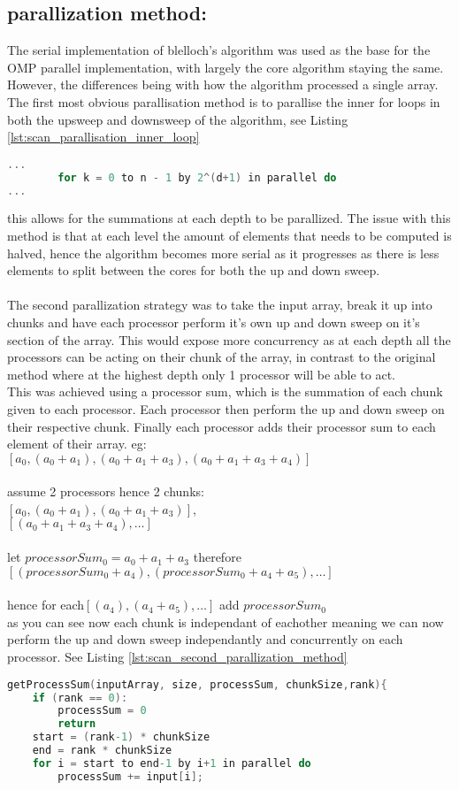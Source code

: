 \subsection*{parallization method:}
The serial implementation of blelloch's algorithm was used as the base for the OMP parallel implementation, with largely the core algorithm staying the same. However, the differences being with how the algorithm processed a single array. The first most obvious parallisation method is to parallise the inner for loops in both the upsweep and downsweep of the algorithm, see Listing \ref{lst:scan_parallisation_inner_loop} 
\begin{lstlisting}[language=C, caption={parallisation of the inner loop}, label={lst:scan_parallisation_inner_loop}]
...
		for k = 0 to n - 1 by 2^(d+1) in parallel do
...
\end{lstlisting}
this allows for the summations at each depth to be parallized. The issue with this method is that at each level the amount of elements that needs to be computed is halved, hence the algorithm becomes more serial as it progresses as there is less elements to split between the cores for both the up and down sweep.\\\\ The second parallization strategy was to take the input array, break it up into chunks and have each processor perform it's own up and down sweep on it's section of the array. This would expose more concurrency as at each depth all the processors can be acting on their chunk of the array, in contrast to the original method where at the highest depth only 1 processor will be able to act.\\This was achieved using a processor sum, which is the summation of each chunk given to each processor. Each processor then perform the up and down sweep on their respective chunk. Finally each processor adds their processor sum to each element of their array. 
eg: $[a_0,(a_0+a_1),(a_0+a_1+a_3),(a_0+a_1+a_3+a_4)]$\\
\\ assume 2 processors hence 2 chunks:\\
$[a_0,(a_0+a_1),(a_0+a_1+a_3)]$,\\$[(a_0+a_1+a_3+a_4),\dots]$\\
\\let $processorSum_0 = a_0+a_1+a_3$ therefore\\
$[(processorSum_0+a_4),(processorSum_0 + a_4 +a_5),\dots] $\\\\hence for each$ [(a_4),(a_4 +a_5),\dots]$ add $processorSum_0$\\
as you can see now each chunk is independant of eachother meaning we can now perform the up and down sweep independantly and concurrently on each processor. See Listing \ref{lst:scan_second_parallization_method} 
\begin{lstlisting}[language=C, caption={Serial Sequenctial Scan Algorithm with + operator}, label={lst:scan_second_parallization_method}]
getProcessSum(inputArray, size, processSum, chunkSize,rank){ 
	if (rank == 0):  
		processSum = 0 
		return 
	start = (rank-1) * chunkSize 
	end = rank * chunkSize
	for i = start to end-1 by i+1 in parallel do
		processSum += input[i];
\end{lstlisting}
